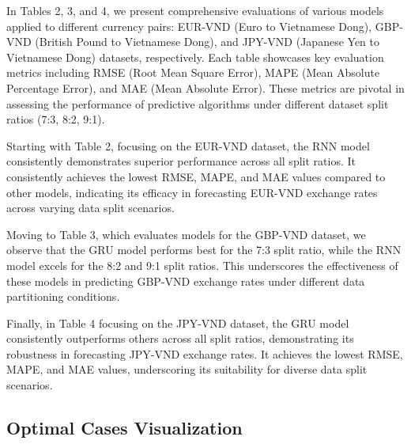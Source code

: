 \documentclass{ieeeojies}
\begin{document}
In Tables 2, 3, and 4, we present comprehensive evaluations of various models applied to different currency pairs: EUR-VND (Euro to Vietnamese Dong), GBP-VND (British Pound to Vietnamese Dong), and JPY-VND (Japanese Yen to Vietnamese Dong) datasets, respectively. Each table showcases key evaluation metrics including RMSE (Root Mean Square Error), MAPE (Mean Absolute Percentage Error), and MAE (Mean Absolute Error). These metrics are pivotal in assessing the performance of predictive algorithms under different dataset split ratios (7:3, 8:2, 9:1).

Starting with Table 2, focusing on the EUR-VND dataset, the RNN model consistently demonstrates superior performance across all split ratios. It consistently achieves the lowest RMSE, MAPE, and MAE values compared to other models, indicating its efficacy in forecasting EUR-VND exchange rates across varying data split scenarios.

Moving to Table 3, which evaluates models for the GBP-VND dataset, we observe that the GRU model performs best for the 7:3 split ratio, while the RNN model excels for the 8:2 and 9:1 split ratios. This underscores the effectiveness of these models in predicting GBP-VND exchange rates under different data partitioning conditions.

Finally, in Table 4 focusing on the JPY-VND dataset, the GRU model consistently outperforms others across all split ratios, demonstrating its robustness in forecasting JPY-VND exchange rates. It achieves the lowest RMSE, MAPE, and MAE values, underscoring its suitability for diverse data split scenarios.

\subsection{Optimal Cases Visualization} 
\end{document}
